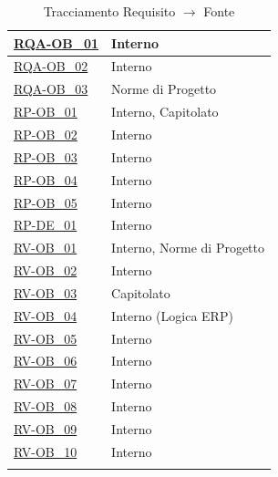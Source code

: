 \begin{longtable}{|>{\raggedright}p{}|>{\raggedright\arraybackslash}p{}|}
    \hyperlink{rqa-ob_1}{RQA-OB\_01} & Interno \\ \hline
    \hyperlink{rqa-ob_2}{RQA-OB\_02} & Interno \\ \hline
    \hyperlink{rqa-ob_3}{RQA-OB\_03} & Norme di Progetto \\ \hline

    \hyperlink{rp-ob_1}{RP-OB\_01} & Interno, Capitolato \\ \hline
    \hyperlink{rp-ob_2}{RP-OB\_02} & Interno \\ \hline
    \hyperlink{rp-ob_3}{RP-OB\_03} & Interno \\ \hline
    \hyperlink{rp-ob_4}{RP-OB\_04} & Interno \\ \hline
    \hyperlink{rp-ob_5}{RP-OB\_05} & Interno \\ \hline

    \hyperlink{rp-de_1}{RP-DE\_01} & Interno \\ \hline

    \hyperlink{rv-ob_1}{RV-OB\_01} & Interno, Norme di Progetto \\ \hline
    \hyperlink{rv-ob_2}{RV-OB\_02} & Interno \\ \hline
    \hyperlink{rv-ob_3}{RV-OB\_03} & Capitolato \\ \hline
    \hyperlink{rv-ob_4}{RV-OB\_04} & Interno (Logica ERP) \\ \hline
    \hyperlink{rv-ob_5}{RV-OB\_05} & Interno \\ \hline
    \hyperlink{rv-ob_6}{RV-OB\_06} & Interno \\ \hline
    \hyperlink{rv-ob_7}{RV-OB\_07} & Interno \\ \hline
    \hyperlink{rv-ob_8}{RV-OB\_08} & Interno \\ \hline
    \hyperlink{rv-ob_9}{RV-OB\_09} & Interno \\ \hline
    \hyperlink{rv-ob_10}{RV-OB\_10} & Interno \\ \hline
    
    \caption{Tracciamento Requisito $\rightarrow$ Fonte}
\end{longtable}